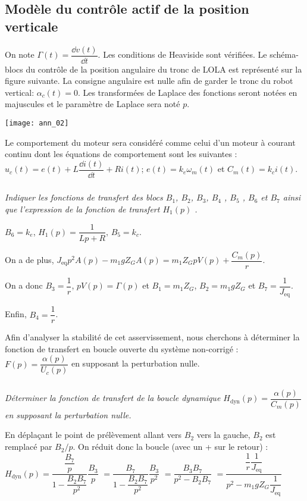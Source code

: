 \begin{multicols}{2}
\subsection*{Modèle du contrôle actif de la position verticale}

On note $\Gamma(t)=\dfrac{\dd v(t)}{\dd t }$. Les conditions de Heaviside sont vérifiées. Le schéma-blocs du contrôle de la position angulaire du tronc de LOLA est représenté sur la figure suivante. La consigne angulaire est nulle afin de garder le
tronc du robot vertical: $\alpha_c(t)=0$. Les transformées de Laplace des fonctions seront notées en majuscules et
le paramètre de Laplace sera noté $p$.

\begin{center}
\texttt{[image: ann\_02]}
\end{center}



Le comportement du moteur sera considéré comme celui d'un moteur à courant continu dont les équations de
comportement sont les suivantes : $u_c (t)=e(t)+L \dfrac{\dd i(t)}{\dd t} +Ri (t)$; $e(t)=k_e\omega_m(t)$ et $C_m( t)=k_c i(t)$.


\subparagraph{} \textit{Indiquer les fonctions de transfert des blocs $B_1$, $B_2$, $B_3$, $B_4$ , $B_5$ , $B_6$ et $B_7$ ainsi que l'expression de la fonction de transfert $H_1(p)$ .}
\ifprof
\begin{corrige}
$B_6 = k_e$, $H_1(p)=\dfrac{1}{Lp + R}$, $B_5 = k_c$. 

On a de plus, $J_{\text{eq}} p^2 A(p) -m_1gZ_GA(p)=m_1 Z_G p V(p) +\dfrac{C_m(p)}{r}$.

On a donc $B_3 = \dfrac{1}{r}$, $p V(p) = \Gamma(p)$ et $B_1 = m_1 Z_G$, $B_2 =m_1gZ_G$ et $B_7 = \dfrac{1}{J_{\text{eq}}}$.

Enfin, $B_4 = \dfrac{1}{r}$.

\end{corrige}
\else
\fi

Afin d'analyser la stabilité de cet asservissement, nous cherchons à déterminer la fonction de transfert en
boucle ouverte du système non-corrigé : $ F(p)= \dfrac{\alpha (p)}{U_c (p)}$ en supposant la perturbation nulle.

\subparagraph{} \textit{Déterminer la fonction de transfert de la boucle dynamique $H_{\text{dyn}}(p)=\dfrac{\alpha (p)}{C_m(p)}$ en supposant la perturbation nulle.}
\ifprof
\begin{corrige}
En déplaçant le point de prélèvement allant vers $B_2$ vers la gauche, $B_2$ est remplacé par $B_2/p$. On réduit donc la boucle (avec un + sur le retour) : $H_{\text{dyn}}(p)=\dfrac{\dfrac{B_7}{p}}{1-\dfrac{B_2B_7}{p^2}}\dfrac{B_3}{p}$ $=\dfrac{B_7}{1-\dfrac{B_2B_7}{p^2}}\dfrac{B_3}{p^2}$
 $=\dfrac{B_3B_7}{p^2-B_2B_7}$
  $=\dfrac{\dfrac{1}{r}\dfrac{1}{J_{\text{eq}}}}{p^2-m_1gZ_G\dfrac{1}{J_{\text{eq}}}}$
  

\end{corrige}
\end{multicols}
